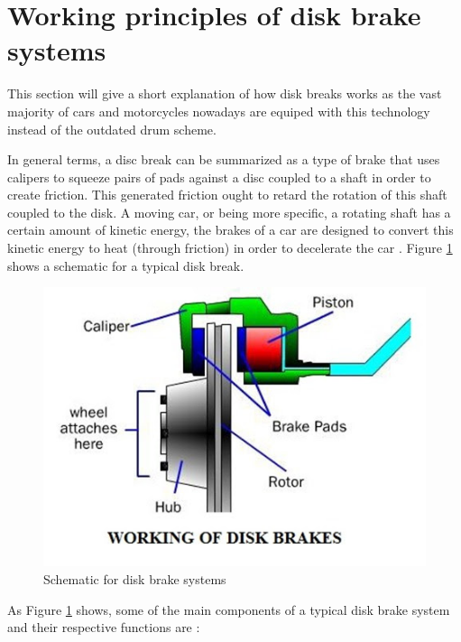 \section{Working principles of disk brake systems}\label{sec:working-principles-of-disk-brake-systems}

		This section will give a short explanation of how disk breaks works as the vast majority of cars and motorcycles nowadays are equiped with this technology instead of the outdated drum scheme.
		\par
		In general terms, a disc break can be summarized as a type of brake that uses calipers to squeeze pairs of pads against a disc coupled to a shaft in order to create friction. This generated friction ought to retard the rotation of this shaft coupled to the disk. A moving car, or being more specific, a rotating shaft has a certain amount of kinetic energy, the brakes of a car are designed to convert this kinetic energy to heat (through friction) in order to decelerate the car \cite{limpert1999brake}. Figure \ref{fig:working-of-disk-breaks} shows a schematic for a typical disk break.

		\begin{figure}[htbp]
			\centering
				\includegraphics[scale=0.55]{figuras/fig-disk_brake_working}
			\caption{Schematic for disk brake systems \cite{fig-working-of-disk-breaks}}
			\label{fig:working-of-disk-breaks}
		\end{figure}

		As Figure \ref{fig:working-of-disk-breaks} shows, some of the main components of a typical disk brake system and their respective functions are \cite{carparts-brake}:

